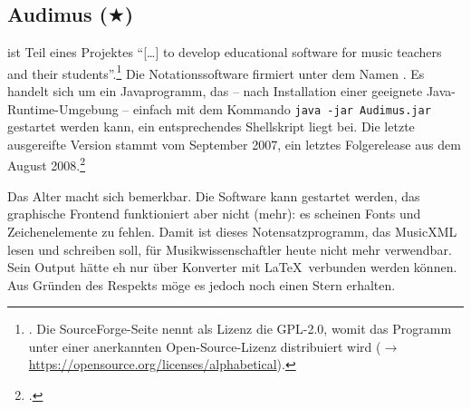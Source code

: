 %
%
%



\subsection{Audimus ($\bigstar$)}

\label{Audimus} ist Teil eines Projektes \enquote{[\ldots] to
develop educational software for music teachers and their
students}.\footnote{\cite[vgl.][\nopage wp.]{Audimus2008a}. Die SourceForge-Seite
nennt als Lizenz die GPL-2.0, womit das Programm unter einer anerkannten
Open-Source-Lizenz distribuiert wird ($\rightarrow$
\href{https://opensource.org/licenses/alphabetical}
{https://opensource.org/licenses/alphabetical}).} Die Notationssoftware
firmiert unter dem Namen . Es handelt sich um ein
Javaprogramm, das -- nach Installation einer geeignete Java-Runtime-Umgebung --
einfach mit dem Kommando \texttt{java -jar Audimus.jar} gestartet werden kann,
ein entsprechendes Shellskript liegt bei. Die letzte ausgereifte Version stammt
vom September 2007, ein letztes Folgerelease aus dem August
2008.\footcite[vgl.][\nopage wp.]{Audimus2008b}

Das Alter macht sich bemerkbar. Die Software kann gestartet werden, das
graphische Frontend funktioniert aber nicht (mehr): es scheinen Fonts und
Zeichenelemente zu fehlen. Damit ist dieses Notensatzprogramm, das MusicXML
lesen und schreiben soll, für Musikwissenschaftler heute nicht mehr verwendbar.
Sein Output hätte eh nur über Konverter mit \LaTeX\ verbunden werden können. Aus
Gründen des Respekts möge es jedoch noch einen Stern erhalten.



%
